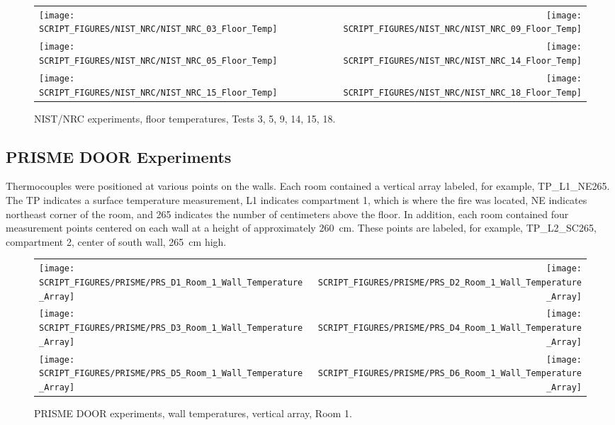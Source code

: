 \begin{figure}[p]
\begin{tabular*}{\textwidth}{l@{\extracolsep{\fill}}r}
\texttt{[image: SCRIPT\_FIGURES/NIST\_NRC/NIST\_NRC\_03\_Floor\_Temp]} &
\texttt{[image: SCRIPT\_FIGURES/NIST\_NRC/NIST\_NRC\_09\_Floor\_Temp]} \\
\texttt{[image: SCRIPT\_FIGURES/NIST\_NRC/NIST\_NRC\_05\_Floor\_Temp]} &
\texttt{[image: SCRIPT\_FIGURES/NIST\_NRC/NIST\_NRC\_14\_Floor\_Temp]} \\
\texttt{[image: SCRIPT\_FIGURES/NIST\_NRC/NIST\_NRC\_15\_Floor\_Temp]} &
\texttt{[image: SCRIPT\_FIGURES/NIST\_NRC/NIST\_NRC\_18\_Floor\_Temp]}
\end{tabular*}
\caption[NIST/NRC experiments, floor temperatures, Tests 3, 5, 9, 14, 15, 18]{NIST/NRC experiments, floor temperatures, Tests 3, 5, 9, 14, 15, 18.}
\label{NIST_NRC_Floor_Temp_Open}
\end{figure}

\clearpage

\subsection{PRISME DOOR Experiments}

Thermocouples were positioned at various points on the walls. Each room contained a vertical array labeled, for example, TP\_L1\_NE265. The TP indicates a surface temperature measurement, L1 indicates compartment 1, which is where the fire was located, NE indicates northeast corner of the room, and 265 indicates the number of centimeters above the floor. In addition, each room contained four measurement points centered on each wall at a height of approximately 260~cm. These points are labeled, for example, TP\_L2\_SC265, compartment 2, center of south wall, 265~cm high.

\begin{figure}[!ht]
\begin{tabular*}{\textwidth}{l@{\extracolsep{\fill}}r}
\texttt{[image: SCRIPT\_FIGURES/PRISME/PRS\_D1\_Room\_1\_Wall\_Temperature\_Array]} &
\texttt{[image: SCRIPT\_FIGURES/PRISME/PRS\_D2\_Room\_1\_Wall\_Temperature\_Array]} \\
\texttt{[image: SCRIPT\_FIGURES/PRISME/PRS\_D3\_Room\_1\_Wall\_Temperature\_Array]} &
\texttt{[image: SCRIPT\_FIGURES/PRISME/PRS\_D4\_Room\_1\_Wall\_Temperature\_Array]} \\
\texttt{[image: SCRIPT\_FIGURES/PRISME/PRS\_D5\_Room\_1\_Wall\_Temperature\_Array]} &
\texttt{[image: SCRIPT\_FIGURES/PRISME/PRS\_D6\_Room\_1\_Wall\_Temperature\_Array]}
\end{tabular*}
\caption[PRISME DOOR experiments, wall temperatures, vertical array, Room 1]{PRISME DOOR experiments, wall temperatures, vertical array, Room 1.}
\label{PRISME_Wall_Array_Room_1}
\end{figure}

